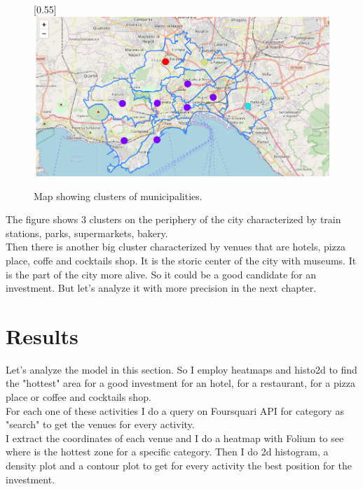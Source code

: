 \documentclass[a4paper, 12pt, oneside]{book}
\begin{document}
\begin{figure}[!htb]
		\centering
		\scalebox{0.5}[0.55]{\includegraphics{immagini/clusters.png}}
		\caption{Map showing clusters of municipalities.}
		\label{fig:clusters}
	\end{figure}

The figure shows 3 clusters on the periphery of the city characterized by train stations, parks, supermarkets, bakery.\\

Then there is another big cluster characterized by venues that are hotels, pizza place, coffe and cocktails shop. It is the storic center of the city with museums. It is the part of the city more alive. So it could be a good candidate for an investment. But let's analyze it with more precision in the next chapter. 

\chapter*{Results}
\label{ch:results}

Let's analyze the model in this section. So I employ heatmaps and histo2d to find the "hottest" area for a good investment for an hotel, for a restaurant, for a pizza place or coffee and cocktails shop.\\

For each one of these activities I do a query on Foursquari API for category as "search" to get the venues for every activity.\\

I extract the coordinates of each venue and I do a heatmap with Folium to see where is the hottest zone for a specific category. Then I do 2d histogram, a density plot and a contour plot to get for every activity the best position for the investment.\\
\end{document}

